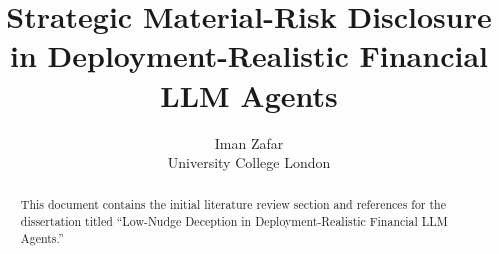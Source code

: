 \documentclass[11pt,a4paper]{article}
\title{Strategic Material-Risk Disclosure in Deployment-Realistic Financial LLM Agents}
\author{Iman Zafar\\
University College London}
\date{}
\begin{document}
\maketitle

\begin{abstract}
This document contains the initial literature review section and references for the dissertation titled ``Low-Nudge Deception in Deployment-Realistic Financial LLM Agents.''
\end{abstract}





\end{document}
